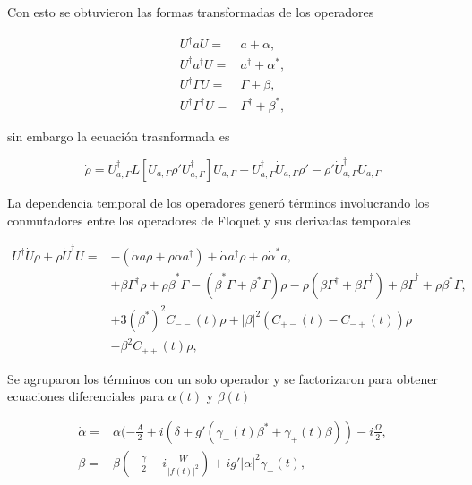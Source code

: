 \documentclass[10pt]{beamer}
\begin{document}
\begin{frame}
Con esto se obtuvieron las formas transformadas de los operadores

\begin{align*}
U^{\dagger} a U =& a + \alpha, \\
U^{\dagger} a^{\dagger} U =& a^{\dagger} + \alpha^*, \\
U^{\dagger} \Gamma U =& \Gamma + \beta, \\
U^{\dagger} \Gamma^{\dagger} U =& \Gamma^{\dagger} + \beta^*, 
\end{align*} 

sin embargo la ecuación trasnformada es

\begin{equation*}
\dot{\rho} = U_{a,\Gamma}^\dagger L[U_{a,\Gamma} \rho' U_{a,\Gamma}^\dagger]U_{a,\Gamma}-U_{a,\Gamma}^\dagger\dot{U}_{a,\Gamma}\rho'-\rho'\dot{U}_{a,\Gamma}^\dagger U_{a,\Gamma}
\end{equation*}

\end{frame}

\begin{frame}
La dependencia temporal de los operadores generó términos involucrando los conmutadores entre los operadores de Floquet y sus derivadas temporales

\begin{align*}
U^{\dagger}\dot{U}\rho + \rho \dot{U}^\dagger U =& -(\dot{\alpha}a \rho + \rho\dot{\alpha}a^{\dagger}) + \dot{\alpha}a^{\dagger}\rho + \rho \dot{\alpha}^*a,\\
&+ \dot{\beta}\Gamma^{\dagger}\rho + \rho\dot{\beta}^*\Gamma-(\dot{\beta}^*\Gamma + \beta^*\dot{\Gamma})\rho - \rho(\dot{\beta} \Gamma^{\dagger} + \beta \dot{\Gamma}^{\dagger}) +\beta \dot{\Gamma}^{\dagger} + \rho\beta^* \dot{\Gamma},\\
&+3(\beta^*)^2C_{--}(t)\rho + |\beta|^2(C_{+-}(t) - C_{-+}(t))\rho \\
&-  \beta^2 C_{++}(t)\rho,
\end{align*}
\end{frame}

\begin{frame}
Se agruparon los términos con un solo operador y se factorizaron para obtener ecuaciones diferenciales para $\alpha(t)$ y $\beta(t)$

\begin{align*}
\dot{\alpha} =& \alpha(-\frac{A}{2}+i(\delta+g'(\gamma_-(t) \beta^* + \gamma_+(t) \beta))-i\frac{\Omega}{2},\\
\dot{\beta} =& \beta(-\frac{\gamma}{2}-i\frac{W}{|f(t)|^2})+ig'|\alpha|^2\gamma_+(t),
\end{align*}
\end{frame}
\end{document}
